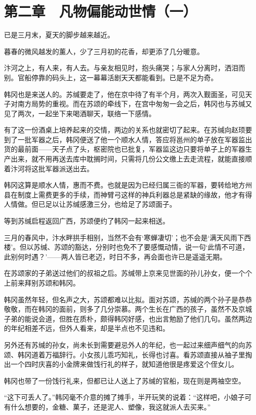 \section{第二章　凡物偏能动世情（一）}

已是三月末，夏天的脚步越来越近。

暮春的微风越发的薰人，少了三月初的花香，却更添了几分暖意。

汴河之上，有人来，有人去。与亲友相见时，抱头痛哭；与家人分离时，洒泪而别。官船停靠的码头上，这一幕幕活剧天天都能看到。已是不足为奇。

韩冈也是来送人的。苏缄要走了，他在京中待了有半个月，两次入觐面圣，可见天子对南方局势的重视。而在苏颂的牵线下，在宫中匆匆一会之后，韩冈也与苏缄又见了两次，一起坐下来喝酒聊天，联络一下感情。

有了这一份酒桌上培养起来的交情，两边的关系也就密切了起来。在苏缄向赵顼要到了一批军器之后，韩冈便送了他一个顺水人情，答应将邕州的单子放在军器监出货的最前面——天子点了头，枢密院也已批复，军器监这边只要将单子上的军器生产出来，就不用再送去库中耽搁时间，只需将几份公文缴上去走流程，就能直接顺着汴河将这批军器派送出去。

韩冈这算是顺水人情，惠而不费。也就是因为已经归属三衙的军器，要转给地方州县在制度上需费更多的手续，而神臂弓这样的神兵利器总是紧缺的缘故，他才有得人情做。但已足以让苏缄感激三分，也给足了苏颂面子。

等到苏缄启程返回广西，苏颂便约了韩冈一起来相送。

三月的春风中，汴水畔拱手相别，当然不会有‘寒蝉凄切’；也不会是‘满天风雨下西楼’。但以苏缄、苏颂的豁达，分别时也免不了要感慨动情，说一句‘此情不可道，此别何时遇？’——两人皆已老迈，时日不多，再会面也许已是遥遥无期。

在苏颂家的子弟送过他们的叔祖之后。苏缄带上京来见世面的孙儿孙女，便一个个上前来拜别苏颂和韩冈。

韩冈虽然年轻，但名声之大，苏颂都难以比拟。面对苏颂，苏缄的两个孙子是恭恭敬敬，而在韩冈的面前，则多了几分崇慕。两个生长在广西的孩子，虽然不及京城子弟的能说会道，但胜在质朴，颇得韩冈好感，也出言勉励了他们几句。虽然两边的年纪相差不远，但外人看来，却是半点也不见违和。

另外还有苏缄的孙女，尚未长到需要避忌外人的年纪，也一起过来细声细气的向苏颂、韩冈道着万福辞行。小女孩儿乖巧知礼，长得也讨喜。看苏颂直接从袖子里掏出一个四时庆喜的小金牌来做饯行礼的样子，就知道他很是疼爱这个侄女儿。

韩冈也带了一份饯行礼来，但都已让人送上了苏缄的官船，现在则是两袖空空。

“这下可丢人了。”韩冈毫不介意的摊了摊手，半开玩笑的说着：“这样吧，小娘子可有什么想要的，金糖、菓子，还是泥人、塑像，我这就派人去买来。”

